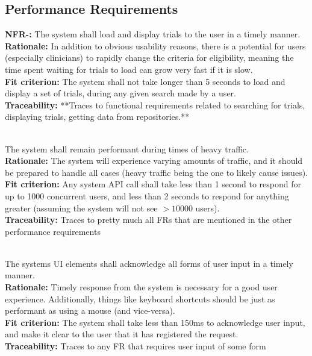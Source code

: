 \documentclass[12pt, titlepage]{article}
\newcounter{NFR_Counter}
\newcounter{FR_Counter}
\begin{document}
\subsection{Performance Requirements}

\textbf{NFR-\the\value{NFR_Counter}:}
The system shall load and display trials to the user in a timely manner.\\
\textbf{Rationale:}
In addition to obvious usability reasons, there is a potential for users (especially clinicians) to rapidly
change the criteria for eligibility, meaning the time spent waiting for trials to load can grow very fast if it is slow.\\
\textbf{Fit criterion:}
The system shall not take longer than 5 seconds to load and display a set of trials, during any given search made by a user.\\
\textbf{Traceability:}
**Traces to functional requirements related to searching for trials, displaying trials, getting data from repositories.** \\~\\
\addtocounter{NFR_Counter}{1}

The system shall remain performant during times of heavy traffic.\\
\textbf{Rationale:}
The system will experience varying amounts of traffic, and it should be prepared to handle all cases (heavy traffic being the 
one to likely cause issues).\\
\textbf{Fit criterion:}
Any system API call shall take less than 1 second to respond for up to 1000 concurrent users, and less than 2 seconds to respond for anything 
greater (assuming the system will not see $>10000$ users).\\
\textbf{Traceability:}
Traces to pretty much all FRs that are mentioned in the other performance requirements \\~\\
\addtocounter{NFR_Counter}{1}

The systems UI elements shall acknowledge all forms of user input in a timely manner.\\
\textbf{Rationale:}
Timely response from the system is necessary for a good user experience. Additionally, things like keyboard
shortcuts should be just as performant as using a mouse (and vice-versa).\\
\textbf{Fit criterion:}
The system shall take less than 150ms to acknowledge user input, and make it clear to the user that it has registered the request.\\
\textbf{Traceability:}
Traces to any FR that requires user input of some form \\~\\
\addtocounter{NFR_Counter}{1}
\end{document}
